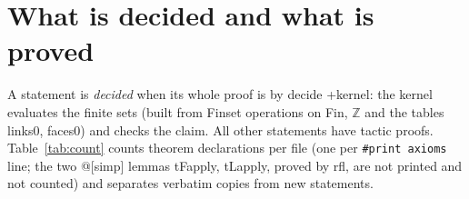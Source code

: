 \documentclass[11pt,a4paper]{article}
\theoremstyle{definition}
\theoremstyle{remark}
\DeclareRobustCommand{\lean}[1]{{\ttfamily\renewcommand{\_}{\textunderscore\allowbreak}#1}}
\begin{document}
\section{What is decided and what is proved}\label{sec:decided}

A statement is \emph{decided} when its whole proof is \lean{by decide +kernel}: the kernel evaluates the finite sets (built from \lean{Finset} operations on \lean{Fin}, $\mathbb{Z}$ and the tables \lean{links0}, \lean{faces0}) and checks the claim. All other statements have tactic proofs. Table~\ref{tab:count} counts theorem declarations per file (one per \texttt{\#print axioms} line; the two \lean{@[simp]} lemmas \lean{tF\_apply}, \lean{tL\_apply}, proved by \lean{rfl}, are not printed and not counted) and separates verbatim copies from new statements.
\end{document}
